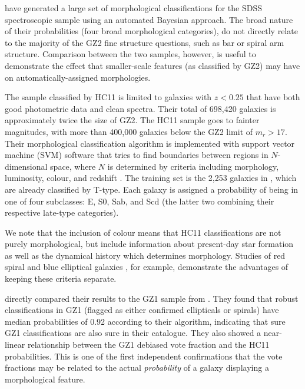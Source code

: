 \documentclass[useAMS,usenatbib]{mn2e}
\begin{document}
\citet[][HC11]{hue11} have generated a large set of morphological classifications for the SDSS spectroscopic sample using an automated Bayesian approach. The broad nature of their probabilities (four broad morphological categories), do not directly relate to the majority of the GZ2 fine structure questions, such as bar or spiral arm structure. Comparison between the two samples, however, is useful to demonstrate the effect that smaller-scale features (as classified by GZ2) may have on automatically-assigned morphologies.

The sample classified by HC11 is limited to galaxies with $z<0.25$ that have both good photometric data and clean spectra. Their total of 698,420 galaxies is approximately twice the size of GZ2. The HC11 sample goes to fainter magnitudes, with more than 400,000 galaxies below the GZ2 limit of $m_r>17$. Their morphological classification algorithm is implemented with support vector machine (SVM) software that tries to find boundaries between regions in $N$-dimensional space, where $N$ is determined by criteria including morphology, luminosity, colour, and redshift \citep{hue08}. The training set is the 2,253 galaxies in \citet{fuk07}, which are already classified by T-type. Each galaxy is assigned a probability of being in one of four subclasses: E, S0, Sab, and Scd (the latter two combining their respective late-type categories). 

We note that the inclusion of colour means that HC11 classifications are not purely morphological, but include information about present-day star formation as well as the dynamical history which determines morphology. Studies of red spiral \citep{mas10a} and blue elliptical galaxies \citep{sch09}, for example, demonstrate the advantages of keeping these criteria separate. 

\citet{hue11} directly compared their results to the GZ1 sample from \citet{lin11}. They found that robust classifications in GZ1 (flagged as either confirmed ellipticals or spirals) have median probabilities of 0.92 according to their algorithm, indicating that sure GZ1 classifications are also sure in their catalogue. They also showed a near-linear relationship between the GZ1 debiased vote fraction and the HC11 probabilities. This is one of the first independent confirmations that the vote fractions may be related to the actual {\em probability} of a galaxy displaying a morphological feature. 

\end{document}
